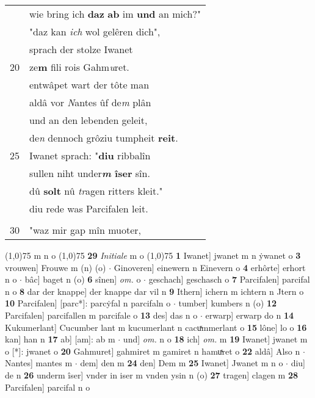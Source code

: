 \documentclass[8pt,a4paper,notitlepage]{article}
\begin{document}
\begin{table}[ht]
\begin{minipage}[t]{0.5\linewidth}
\begin{tabular}{rl}
 & wie bring ich \textbf{daz} \textbf{ab} im \textbf{und} an mich?"\\ 
 & "daz kan \textit{ich} wol gelêren dich",\\ 
 & sprach der stolze Iwanet\\ 
20 & ze\textbf{m} fili rois Gahm\textit{u}ret.\\ 
 & entwâpet wart der tôte man\\ 
 & aldâ vor \textit{N}antes ûf de\textit{m} plân\\ 
 & und an den lebenden geleit,\\ 
 & de\textit{n} dennoch grôziu tumpheit \textbf{reit}.\\ 
25 & Iwanet sprach: "\textbf{diu} ribbalîn\\ 
 & sullen niht under\textbf{\textit{m} îser} sîn.\\ 
 & dû \textbf{solt} nû \textit{tr}agen ritters kleit."\\ 
 & diu rede was Parcifalen leit.\\ 
 & \textbf{\begin{large}D\end{large}ô} sprach der knappe guoter:\\ 
30 & "waz mir gap mîn muoter,\\ 
\end{tabular}
\scriptsize
\line(1,0){75} \newline
m n o \newline
\line(1,0){75} \newline
\textbf{29} \textit{Initiale} m o  \newline
\line(1,0){75} \newline
\textbf{1} Iwanet] jwanet m n ẏwanet o \textbf{3} vrouwen] Frouwe m (n) (o)  $\cdot$ Ginoveren] einewern n Einevern o \textbf{4} erhôrte] erhort n o  $\cdot$ bâc] baget n (o) \textbf{6} sînen] \textit{om.} o  $\cdot$ geschach] geschasch o \textbf{7} Parcifalen] parcifal n o \textbf{8} dar der knappe] der knappe dar vil n \textbf{9} Ithern] ichern m ichtern n Jtern o \textbf{10} Parcifalen] [parc*]: parcẏfal n parcifaln o  $\cdot$ tumber] kumbers n (o) \textbf{12} Parcifalen] parcifallen m parcifale o \textbf{13} des] das n o  $\cdot$ erwarp] erwarp do n \textbf{14} Kukumerlant] Cucumber lant m kucumerlant n cacuͯmmerlant o \textbf{15} lône] lo o \textbf{16} kan] han n \textbf{17} ab] [am]: ab m  $\cdot$ und] \textit{om.} n o \textbf{18} ich] \textit{om.} m \textbf{19} Iwanet] jwanet m o [*]: jwanet o \textbf{20} Gahmuret] gahmiret m gamiret n hamuͯret o \textbf{22} aldâ] Also n  $\cdot$ Nantes] mantes m  $\cdot$ dem] den m \textbf{24} den] Dem m \textbf{25} Iwanet] Jwanet m n o  $\cdot$ diu] de n \textbf{26} underm îser] vnder in iser m vnden ysin n (o) \textbf{27} tragen] clagen m \textbf{28} Parcifalen] parcifal n o \newline
\end{minipage}
\end{table}
\end{document}
